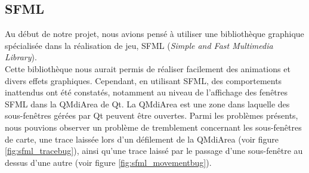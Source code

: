 \subsection{SFML}

Au début de notre projet, nous avions pensé à utiliser une bibliothèque graphique spécialisée dans la réalisation de jeu, SFML (\textit{Simple and Fast Multimedia Library}).\\

Cette bibliothèque nous aurait permis de réaliser facilement des animations et divers effets graphiques. 
Cependant, en utilisant SFML, des comportements inattendus ont été constatés, notamment au niveau de l'affichage des fenêtres SFML dans la QMdiArea de Qt. La QMdiArea est une zone dans laquelle des sous-fenêtres gérées par Qt peuvent être ouvertes. Parmi les problèmes présents, nous pouvions observer un problème de tremblement concernant les sous-fenêtres de carte, une trace laissée lors d'un défilement de la QMdiArea (voir figure \ref{fig:sfml_tracebug}), ainsi qu'une trace laissé par le passage d'une sous-fenêtre au dessus d'une autre (voir figure \ref{fig:sfml_movementbug}).

